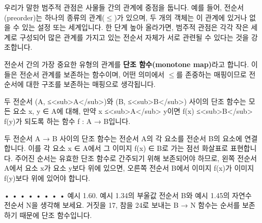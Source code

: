 \documentclass[11pt, a4paper, twoside, openany]{book}
\begin{document}
우리가 말한 범주적 관점은 사물들 간의 관계에 중점을 둡니다. 예를 들어, 전순서(preorder)는 하나의 종류의 관계($\leq$)가 있으며, 두 개의 객체는 이 관계에 있거나 없을 수 있는 설정 또는 세계입니다. 한 단계 높아 올라가면, 범주적 관점은 각각 작은 세계로 구성되어 많은 관계를 가지고 있는 전순서 자체가 서로 관련될 수 있다는 것을 강조합니다.

\par\medskip
전순서 간의 가장 중요한 유형의 관계를 \textbf{단조 함수(monotone map)}라고 합니다. 이들은 전순서 관계를 보존하는 함수이며, 어떤 의미에서 $\leq$를 존중하는 매핑이므로 전순서에 대한 구조를 보존하는 매핑으로 생각됩니다.

\par\medskip
\begin{definitionbox}[정의 1.59.]
두 전순서 (A, ≤<sub>A</sub>)와 (B, ≤<sub>B</sub>) 사이의 단조 함수는 모든 요소 x, y ∈ A\hspace{0pt}에 대해, 만약 x ≤<sub>A</sub> y\hspace{0pt}이면 f(x) ≤<sub>B</sub> f(y)가 되도록 하는 함수 f : A → B\hspace{0pt}입니다.
\end{definitionbox}

\par\medskip
두 전순서 A → B 사이의 단조 함수는 전순서 A\hspace{0pt}의 각 요소를 전순서 B\hspace{0pt}의 요소에 연결합니다. 이를 각 요소 x ∈ A\hspace{0pt}에서 그 이미지 f(x) ∈ B\hspace{0pt}로 가는 점선 화살표로 표현합니다. 주어진 순서는 유효한 단조 함수로 간주되기 위해 보존되어야 하므로, 왼쪽 전순서 A\hspace{0pt}에서 요소 x\hspace{0pt}가 요소 y\hspace{0pt}보다 위에 있으면, 오른쪽 전순서 B\hspace{0pt}에서 이미지 f(x)가 이미지 f(y)보다 위에 있어야 합니다.

\par\medskip
•
•
•
•
•
•
•
•
예시 1.60. 예시 1.34\hspace{0pt}의 부울값 전순서 B\hspace{0pt}와 예시 1.45\hspace{0pt}의 자연수 전순서 N\hspace{0pt}을 생각해 보세요. 거짓을 17, 참을 24\hspace{0pt}로 보내는 B → N 함수는 순서를 보존하기 때문에 단조 함수입니다.
\end{document}
